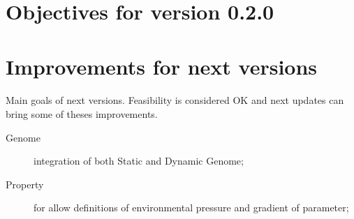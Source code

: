 \documentclass{report} %
\begin{document}
    \section*{Objectives for version \textbf{0.2.0}}
    \paragraph*{}




\section*{Improvements for next versions}
    \paragraph*{}
    Main goals of next versions. Feasibility is considered OK and next updates can bring some of theses improvements.
    \begin{description}
            \item[Genome] integration of both Static and Dynamic Genome;
            \item[Property] for allow definitions of environmental pressure and gradient of parameter;
    \end{description}
\end{document}
